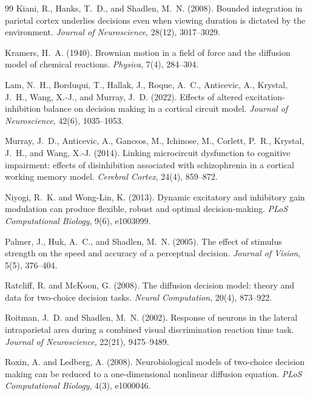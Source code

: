\documentclass[11pt]{article}
\begin{document}
\begin{thebibliography}{99}
		Kiani, R., Hanks, T.~D., and Shadlen, M.~N. (2008).
		Bounded integration in parietal cortex underlies decisions even when viewing duration is dictated by the environment.
		\textit{Journal of Neuroscience}, 28(12), 3017--3029.
		
		Kramers, H.~A. (1940).
		Brownian motion in a field of force and the diffusion model of chemical reactions.
		\textit{Physica}, 7(4), 284--304.
		
		Lam, N.~H., Borduqui, T., Hallak, J., Roque, A.~C., Anticevic, A., Krystal, J.~H., Wang, X.-J., and Murray, J.~D. (2022).
		Effects of altered excitation-inhibition balance on decision making in a cortical circuit model.
		\textit{Journal of Neuroscience}, 42(6), 1035--1053.
		
		Murray, J.~D., Anticevic, A., Gancsos, M., Ichinose, M., Corlett, P.~R., Krystal, J.~H., and Wang, X.-J. (2014).
		Linking microcircuit dysfunction to cognitive impairment: effects of disinhibition associated with schizophrenia in a cortical working memory model.
		\textit{Cerebral Cortex}, 24(4), 859--872.
		
		Niyogi, R.~K. and Wong-Lin, K. (2013).
		Dynamic excitatory and inhibitory gain modulation can produce flexible, robust and optimal decision-making.
		\textit{PLoS Computational Biology}, 9(6), e1003099.
		
		Palmer, J., Huk, A.~C., and Shadlen, M.~N. (2005).
		The effect of stimulus strength on the speed and accuracy of a perceptual decision.
		\textit{Journal of Vision}, 5(5), 376--404.
		
		Ratcliff, R. and McKoon, G. (2008).
		The diffusion decision model: theory and data for two-choice decision tasks.
		\textit{Neural Computation}, 20(4), 873--922.
		
		Roitman, J.~D. and Shadlen, M.~N. (2002).
		Response of neurons in the lateral intraparietal area during a combined visual discrimination reaction time task.
		\textit{Journal of Neuroscience}, 22(21), 9475--9489.
		
		Roxin, A. and Ledberg, A. (2008).
		Neurobiological models of two-choice decision making can be reduced to a one-dimensional nonlinear diffusion equation.
		\textit{PLoS Computational Biology}, 4(3), e1000046.
		

\end{thebibliography}
\end{document}
